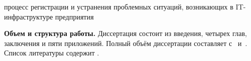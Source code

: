 \newcommand{\aim}{\textbf{Целью}}
\newcommand{\scope}{\textbf{Область исследования}}
\newcommand{\subject}{\textbf{Предметом исследования}}
 процесс регистрации и устранения проблемных ситуаций, возникающих в IT-инфраструктуре предприятия 
\newcommand{\tasks}{задачи}
\newcommand{\defpositions}{\textbf{Основные положения, выносимые на~защиту:}}
\newcommand{\novelty}{\textbf{Научная новизна:}}
\newcommand{\influence}{\textbf{Практическая значимость}}
\newcommand{\reliability}{\textbf{Степень достоверности}}
\newcommand{\probation}{\textbf{Апробация работы.}}
\newcommand{\contribution}{\textbf{Личный вклад.}}
\newcommand{\publications}{\textbf{Публикации.}}

\textbf{Объем и структура работы.} Диссертация состоит из введения, четырех глав, заключения и пяти приложений. Полный объём диссертации составляет  
с~
и~. Список литературы содержит  
.
\clearpage



